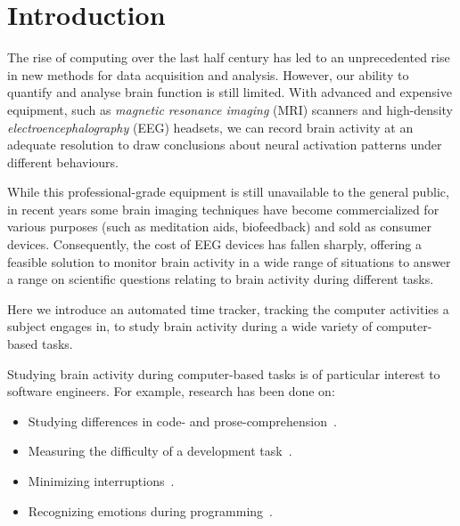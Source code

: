 \chapter{Introduction}




The rise of computing over the last half century has led to an unprecedented rise in new methods for data acquisition and analysis. However, our ability to quantify and analyse brain function is still limited. With advanced and expensive equipment, such as \emph{magnetic resonance imaging} (MRI) scanners and high-density \emph{electroencephalography} (EEG) headsets, we can record brain activity at an adequate resolution to draw conclusions about neural activation patterns under different behaviours.

While this professional-grade equipment is still unavailable to the general public, in recent years some brain imaging techniques have become commercialized for various purposes (such as meditation aids, biofeedback) and sold as consumer devices. Consequently, the cost of EEG devices has fallen sharply, offering a feasible solution to monitor brain activity in a wide range of situations to answer a range on scientific questions relating to brain activity during different tasks.


Here we introduce an automated time tracker, tracking the computer activities a subject engages in, to study brain activity during a wide variety of computer-based tasks.

\begin{minipage}{\textwidth}

Studying brain activity during computer-based tasks is of particular interest to software engineers. For example, research has been done on:

\begin{itemize}
    \item Studying differences in code- and prose-comprehension~\cite{floyd_decoding_2017}\cite{fucci_replication_2019}.
    \item Measuring the difficulty of a development task~\cite{fritz_using_2014}.
    \item Minimizing interruptions~\cite{zuger_reducing_2017}.
    \item Recognizing emotions during programming~\cite{girardi_recognizing_2020}.
\end{itemize}

\end{minipage}

